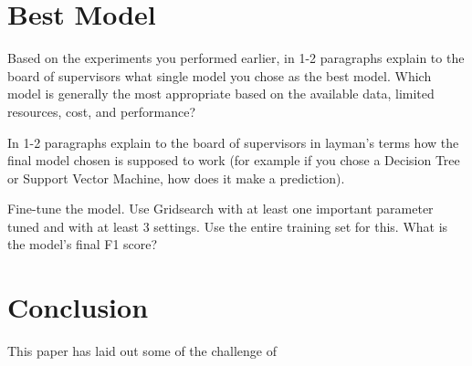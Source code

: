 \documentclass[12pt]{article}
\begin{document}

\section*{Best Model}
Based on the experiments you performed earlier, in 1-2 paragraphs explain to the board of supervisors what single model you chose as the best model. Which model is generally the most appropriate based on the available data, limited resources, cost, and performance?

In 1-2 paragraphs explain to the board of supervisors in layman's terms how the final model chosen is supposed to work (for example if you chose a Decision Tree or Support Vector Machine, how does it make a prediction).

Fine-tune the model. Use Gridsearch with at least one important parameter tuned and with at least 3 settings. Use the entire training set for this.
What is the model's final F1 score?


\section*{Conclusion}

This paper has laid out some of the challenge of 













\end{document}
